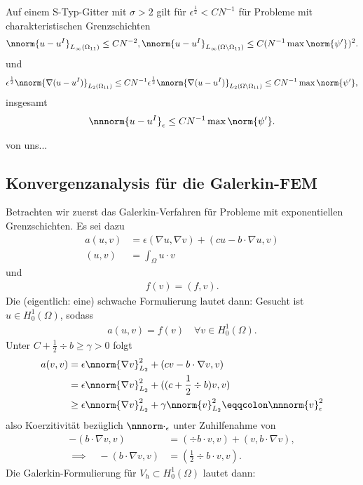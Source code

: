 \begin{satz}\label{thm:7-12}
  Auf einem S-Typ-Gitter mit $\sigma>2$ gilt für $\epsilon^{\frac 12} < CN^{-1}$ für Probleme mit charakteristischen Grenzschichten
  \begin{align*}
    \nnorm{u - u^{I}}_{L_{\infty}(\Omega_{11})} \leq C N^{-2},
    \nnorm{u - u^{I}}_{L_{\infty}(\Omega\setminus\Omega_{11})} \leq C (N^{-1} \max\norm{\psi'})^{2}. 
  \end{align*}
und
\begin{align*}
  \epsilon^{\frac 12} \nnorm{\nabla(u - u^{I})}_{L_{2}(\Omega_{11})} \leq C N^{-1}  \epsilon^{\frac 12} \nnorm{\nabla(u - u^{I})}_{L_{2}(\Omega\setminus\Omega_{11})} \leq C N^{-1} \max \norm{\psi'}, 
\end{align*}
insgesamt
\begin{align*}
  \nnnorm{u - u^{I}}_{\epsilon} \leq C N^{-1} \max \norm{\psi'}. 
\end{align*}
\end{satz}
\begin{beweis}
  von uns...
\end{beweis}


\subsection{Konvergenzanalysis für die Galerkin-FEM}
\label{sec:konv-fur-die}
Betrachten wir zuerst das Galerkin-Verfahren für Probleme mit exponentiellen Grenzschichten. Es sei dazu
\begin{align*}
  a(u, v) &= \epsilon(\nabla u, \nabla v) + (cu -b \cdot \nabla u, v)\\
  (u, v) &= \int_{\Omega} u\cdot v
\end{align*}
und
\begin{align*}
  f(v) = (f, v). 
\end{align*}
Die (eigentlich: eine) schwache Formulierung lautet dann: Gesucht ist $u \in H_{0}^{1}(\Omega)$, sodass
\begin{align*}
  a(u, v) = f(v) \quad \forall v \in H_{0}^{1}(\Omega). 
\end{align*}
Unter $C + \frac 12 \div b \geq \gamma > 0$ folgt
\begin{align*}
  a(v, v) &= \epsilon \nnorm{\nabla v}_{L_{2}}^{2} + (c v - b \cdot \nabla v, v)\\
  &= \epsilon \nnorm{\nabla v}_{L_{2}}^{2} + ((c + \frac 12 \div b)v, v)\\
& \geq \epsilon \nnorm{\nabla v}_{L_{2}}^{2} + \gamma\nnorm{v}_{L_{2}}^{2} \eqqcolon \nnnorm{v}^{2}_{\epsilon}
\end{align*}
also Koerzitivität bezüglich $\nnnorm \cdot _{\epsilon}$ unter Zuhilfenahme von
\begin{align*}
  - (b \cdot \nabla v, v) &= (\div b \cdot v, v) + (v, b \cdot \nabla v),\\
\implies \quad   - (b \cdot \nabla v, v) &= (\frac 12 \div b \cdot v, v).
\end{align*}
Die Galerkin-Formulierung für $V_{h} \subset H_{0}^{1}(\Omega)$ lautet dann: 

